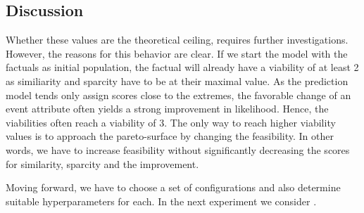 \documentclass[./../../paper.tex]{subfiles}
\begin{document}
\subsection{Discussion}
Whether these values are the theoretical ceiling, requires further investigations. However, the reasons for this behavior are clear. If we start the model with the factuals as initial population, the factual will already have a viability of at least 2 as similiarity and sparcity have to be at their maximal value. As the prediction model tends only assign scores close to the extremes, the favorable change of an event attribute often yields a strong improvement in likelihood. Hence, the viabilities often reach a viability of 3. The only way to reach higher viability values is to approach the pareto-surface by changing the feasibility. In other words, we have to increase feasibility without significantly decreasing the scores for similarity, sparcity and the improvement. 

Moving forward, we have to choose a set of configurations and also determine suitable hyperparameters for each. In the next experiment we consider .  
\end{document}
